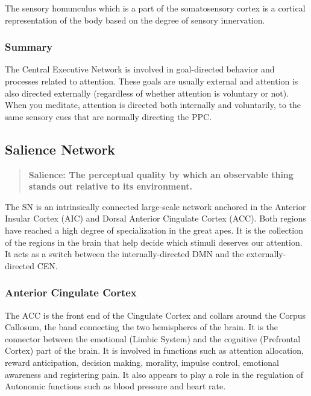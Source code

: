 \documentclass[a4paper, amsfonts, amssymb, amsmath, reprint, showkeys, nofootinbib, twoside]{revtex4-1}
\begin{document}
The sensory homunculus which is a part of the somatosensory cortex is a cortical representation
of the body based on the degree of sensory innervation. \cite{sensoryhom}



\subsubsection{Summary}

The Central Executive Network is involved in goal-directed behavior and processes
related to attention. These goals are usually external and attention is also directed
externally (regardless of whether attention is voluntary or not). When you meditate,
attention is directed both internally and voluntarily, to the same sensory cues that
are normally directing the PPC. 

\subsection{Salience Network}

\begin{quote}
  \textbf{Salience: The perceptual quality by which an observable thing stands out
    relative to its environment.}
\end{quote}

The SN is an intrinsically connected large-scale network anchored in the Anterior
Insular Cortex (AIC) and Dorsal Anterior Cingulate Cortex (ACC). Both regions have reached a
high degree of specialization in the great apes. It is the collection of the regions
in the brain that help decide which stimuli deserves our attention. It acts as a
switch between the internally-directed DMN and the externally-directed CEN. \cite{saliencenetwork}

\subsubsection{Anterior Cingulate Cortex}

The ACC is the front end of the Cingulate Cortex and collars around the Corpus
Callosum, the band connecting the two hemispheres of the brain. It is the connector
between the emotional (Limbic System) and the cognitive (Prefrontal Cortex) part of
the brain. It is involved in functions such as attention allocation, reward
anticipation, decision making, morality, impulse control, emotional awareness and
registering pain. \cite{accstroop,accreward,snmorality,empathypain,acccognitive} It
also appears to play a role in the regulation of Autonomic functions such as blood
pressure and heart rate. \cite{accbloodpressure}
\end{document}
